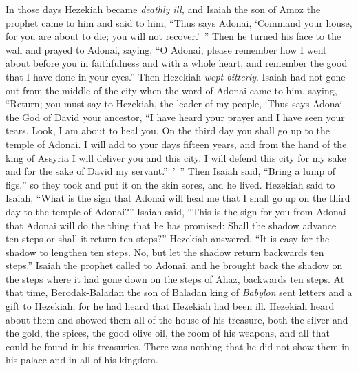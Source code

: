 \begin{biblechapter} %
 In those days Hezekiah became \textit{deathly ill}, and Isaiah the son of Amoz the prophet came to him and said to him, “Thus says Adonai, ‘Command your house, for you are about to die; you will not recover.’ ”
\verse Then he turned his face to the wall and prayed to Adonai, saying,
\verse “O Adonai, please remember how I went about before you in faithfulness and with a whole heart, and remember the good that I have done in your eyes.” Then Hezekiah \textit{wept bitterly}.
\verse Isaiah had not gone out from the middle of the city when the word of Adonai came to him, saying,
\verse “Return; you must say to Hezekiah, the leader of my people, ‘Thus says Adonai the God of David your ancestor, “I have heard your prayer and I have seen your tears. Look, I am about to heal you. On the third day you shall go up to the temple of Adonai.
\verse I will add to your days fifteen years, and from the hand of the king of Assyria I will deliver you and this city. I will defend this city for my sake and for the sake of David my servant.” ’ ”
\verse Then Isaiah said, “Bring a lump of figs,” so they took and put it on the skin sores, and he lived.
\verse Hezekiah said to Isaiah, “What is the sign that Adonai will heal me that I shall go up on the third day to the temple of Adonai?”
\verse Isaiah said, “This is the sign for you from Adonai that Adonai will do the thing that he has promised: Shall the shadow advance ten steps or shall it return ten steps?”
\verse Hezekiah answered, “It is easy for the shadow to lengthen ten steps. No, but let the shadow return backwards ten steps.”
\verse Isaiah the prophet called to Adonai, and he brought back the shadow on the steps where it had gone down on the steps of Ahaz, backwards ten steps.
 At that time, Berodak-Baladan the son of Baladan king of \textit{Babylon} sent letters and a gift to Hezekiah, for he had heard that Hezekiah had been ill.
\verse Hezekiah heard about them and showed them all of the house of his treasure, both the silver and the gold, the spices, the good olive oil, the room of his weapons, and all that could be found in his treasuries. There was nothing that he did not show them in his palace and in all of his kingdom.

\end{biblechapter}
